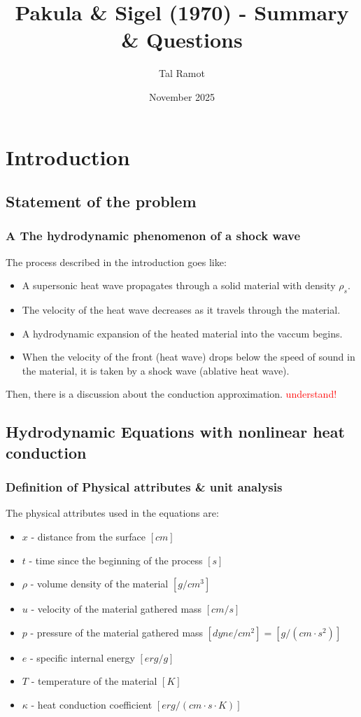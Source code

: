 \documentclass{article}
\title{Pakula \& Sigel (1970) - Summary \& Questions}
\author{Tal Ramot}
\date{November 2025}
\begin{document}
\maketitle

\section{Introduction}
\subsection{Statement of the problem}
\subsubsection{A The hydrodynamic phenomenon of a shock wave}
The process described in the introduction goes like:
\begin{itemize}
    \item A supersonic heat wave propagates through a solid material with density $\rho_s$.
    \item The velocity of the heat wave decreases as it travels through the material.
    \item A hydrodynamic expansion of the heated material into the vaccum begins.
    \item When the velocity of the front (heat wave) drops below the speed of sound in the material, 
    it is taken by a shock wave (ablative heat wave). 
\end{itemize}
Then, there is a discussion about the conduction approximation. 
\textcolor{red}{understand!}

\subsection{Hydrodynamic Equations with nonlinear heat conduction}
\subsubsection{Definition of Physical attributes \& unit analysis}
The physical attributes used in the equations are:
\begin{itemize}
    \item $x$ - distance from the surface $[cm]$
    \item $t$ - time since the beginning of the process $[s]$
    \item $\rho$ - volume density of the material $[g/cm^3]$
    \item $u$ - velocity of the material gathered mass $[cm/s]$
    \item $p$ - pressure of the material gathered mass $[dyne/cm^2]=[g/(cm\cdot s^2)]$
    \item $e$ - specific internal energy $[erg/g]$
    \item $T$ - temperature of the material $[K]$
    \item $\kappa$ - heat conduction coefficient $[erg/(cm \cdot s \cdot K)]$
\end{itemize}
\end{document}
